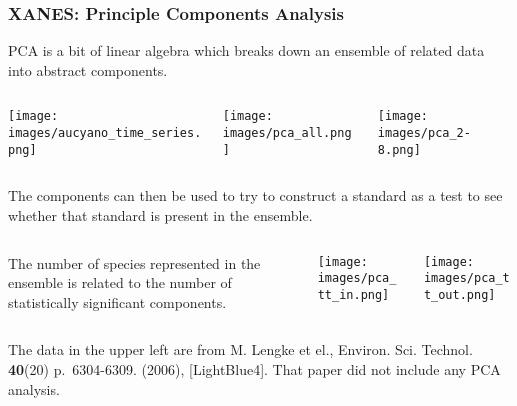 \documentclass[10pt, xcolor=x11names, compress]{beamer}
\begin{document}
\begin{frame}
  \frametitle{XANES: Principle Components Analysis}
  \small%
  PCA is a bit of linear algebra which breaks down an ensemble of
  related data into abstract components.
  \begin{columns}[T]
    \begin{column}{0.33\linewidth}
      \texttt{[image: images/aucyano\_time\_series.png]}
    \end{column}
    \begin{column}{0.33\linewidth}
      \texttt{[image: images/pca\_all.png]}      
    \end{column}
    \begin{column}{0.33\linewidth}
      \texttt{[image: images/pca\_2-8.png]}            
    \end{column}
  \end{columns}

  \medskip

  The components can then be used to try to construct a standard as a
  test to see whether that standard is present in the ensemble.

  \medskip

  \begin{columns}
    \begin{column}{0.33\linewidth}
      The number of species represented in the ensemble is related to
      the number of statistically significant components.
    \end{column}
    \begin{column}{0.33\linewidth}
      \texttt{[image: images/pca\_tt\_in.png]}
    \end{column}
    \begin{column}{0.33\linewidth}
      \texttt{[image: images/pca\_tt\_out.png]}
    \end{column}
  \end{columns}
  \begin{bottomnote}[0.48][19]
    The data in the upper left are from M. Lengke et el.,
    Environ. Sci. Technol. \textbf{40}(20) p.~6304-6309. (2006),
    [LightBlue4].  That paper did not
    include any PCA analysis.
  \end{bottomnote}
\end{frame}
\end{document}
